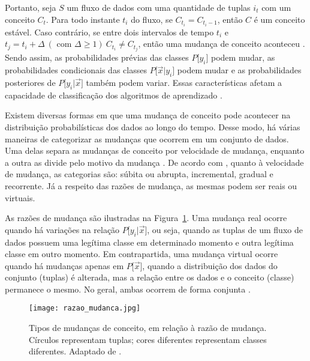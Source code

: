 Portanto, seja $S$ um fluxo de dados com uma quantidade de tuplas $i_t$ com um conceito $C_t$. 
Para todo instante $t_i$ do fluxo, se $C_{t_i} = C_{t_i-1}$, então $C$ é um conceito estável. Caso contrário, se entre dois intervalos de tempo $t_i$ e $t_j = t_i + \Delta \ (\text{ com } \Delta \geq 1)  \ C_{t_i} \neq C_{t_j}$, então uma mudança de conceito aconteceu \cite{Barddal2017}.  
Sendo assim, as probabilidades prévias das classes  $P\big[ y_i \big]$ podem mudar, as probabilidades condicionais das classes $P\big[ \vec{x} \vert  y_i \big]$ podem mudar e as probabilidades posteriores de $P\big[ y_i \vert  \vec{x} \big]$ também podem variar. Essas características afetam a capacidade de classificação dos algoritmos de aprendizado \cite{Gama2014}.

Existem diversas formas em que uma mudança de conceito pode acontecer na distribuição probabilísticas dos dados ao longo do tempo. Desse modo, há várias maneiras de categorizar as mudanças que ocorrem em um conjunto de dados. Uma delas separa as mudanças de conceito por velocidade de mudança, enquanto a outra as divide pelo motivo da mudança \cite{Goncalves2014}. De acordo com , quanto à velocidade de mudança, as categorias são: súbita ou abrupta, incremental, gradual e recorrente. Já a respeito das razões de mudança, as mesmas podem ser reais ou virtuais. 

As razões de mudança são ilustradas na Figura~\ref{fig:razao_mudanca}. Uma mudança real ocorre quando há variações na relação $P\big[ y_i  \vert \vec{x} \big]$, ou seja, quando as tuplas de um fluxo de dados possuem uma legítima classe em determinado momento e outra legítima classe em outro momento. Em contrapartida, uma mudança virtual ocorre quando há mudanças apenas em  $P\big[ \vec{x} \big]$, quando a distribuição dos dados do conjunto (tuplas) é alterada, mas a relação entre os dados e o conceito (classe) permanece o mesmo. No geral, ambas ocorrem de forma conjunta \cite{Goncalves2014}.

\begin{figure}[!htb]
  \centering
    \texttt{[image: razao\_mudanca.jpg]}
    \caption[Tipos de mudanças de conceito, em relação à razão de mudança.] %
    {Tipos de mudanças de conceito, em relação à razão de mudança. Círculos representam tuplas;  cores diferentes representam classes diferentes. Adaptado de .}
    \label{fig:razao_mudanca}
\end{figure}

